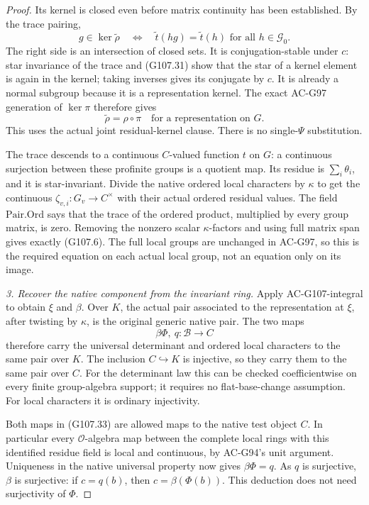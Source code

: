 \begin{proof}
Its kernel is closed even before matrix continuity
has been established.  By the trace pairing,
\[
 g\in\ker\widetilde\rho
 \quad\Longleftrightarrow\quad
 \widetilde t(hg)=\widetilde t(h)
                         \text{ for all }h\in\mathcal G_0.
 \tag{G107.31}
\]
The right side is an intersection of closed sets.
It is conjugation-stable under \(c\):
star invariance of the trace and (G107.31) show that
the star of a kernel element is again in the kernel;
taking inverses gives its conjugate by \(c\).
It is already a normal subgroup because it is a
representation kernel.
The exact AC-G97 generation of \(\ker\pi\)
therefore gives
\[
                   \widetilde\rho=\rho\circ\pi
                       \quad\text{for a representation on }G .
 \tag{G107.32}
\]
This uses the actual joint residual-kernel clause.
There is no single-\(\Psi\) substitution.

The trace descends to a continuous \(C\)-valued
function \(t\) on \(G\): a continuous surjection
between these profinite groups is a quotient map.
Its residue is \(\sum_i\theta_i\), and it is
star-invariant.
Divide the native ordered local characters by
\(\kappa\) to get the continuous
\(\zeta_{v,i}:G_v\to C^\times\) with their actual
ordered residual values.
The field \(\mathrm{Pair.Ord}\) says that the trace
of the ordered product, multiplied by every group
matrix, is zero.
Removing the nonzero scalar \(\kappa\)-factors
and using full matrix span gives exactly (G107.6).
The full local groups are unchanged in AC-G97,
so this is the required equation on each actual
local group, not an equation only on its image.

\emph{3. Recover the native component from the invariant ring.}
Apply AC-G107-integral to obtain \(\xi\) and \(\beta\).
Over \(K\), the actual pair associated to the
representation at \(\xi\), after twisting by \(\kappa\),
is the original generic native pair.
The two maps
\[
                  \beta\Phi,\ q:\mathscr B\longrightarrow C
 \tag{G107.33}
\]
therefore carry the universal determinant and
ordered local characters to the same pair over \(K\).
The inclusion \(C\hookrightarrow K\) is injective,
so they carry them to the same pair over \(C\).
For the determinant law this can be checked
coefficientwise on every finite group-algebra support;
it requires no flat-base-change assumption.
For local characters it is ordinary injectivity.

Both maps in (G107.33) are allowed maps to the native
test object \(C\).
In particular every \(\mathcal O\)-algebra map between
the complete local rings with this identified residue
field is local and continuous, by AC-G94's unit argument.
Uniqueness in the native universal property now gives
\(\beta\Phi=q\).
As \(q\) is surjective, \(\beta\) is surjective:
if \(c=q(b)\), then \(c=\beta(\Phi(b))\).
This deduction does not need surjectivity of \(\Phi\).


\end{proof}
